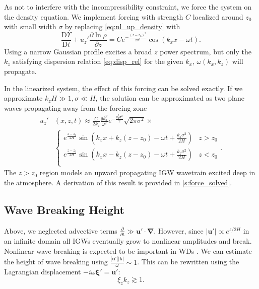\documentclass[
        fleqn,
        usenatbib,
    ]{mnras}
\newcommand*{\pd}[2]{\frac{\partial#1}{\partial#2}}
\newcommand*{\md}[2]{\frac{\mathrm{D}#1}{\mathrm{D}#2}}
\newcommand*{\abs}[1]{\left|#1\right|}
\newcommand*{\p}[1]{\left(#1\right)}
\newcommand*{\bm}[1]{\boldsymbol{\mathbf{#1}}}
\begin{document}
As not to interfere with the incompressibility constraint, we force the system
on the density equation. We implement forcing with strength $C$ localized around
$z_0$ with small width $\sigma$ by replacing \autoref{eq:nl_up_density} with
\begin{equation}
    \md{\Upsilon}{t} + u_{z}'\pd{\ln \overline{\rho}}{z}
        = Ce^{-\frac{(z - z_0)^2}{2\sigma^2}}
            \cos \p{k_{x}x - \omega t}.\label{eq:vol_drive}
\end{equation}
Using a narrow Gaussian profile excites a broad $z$ power spectrum, but only the
$k_{z}$ satisfying dispersion relation \autoref{eq:disp_rel} for the given
$k_{x}$, $\omega(k_{x}, k_{z})$ will propagate.

In the linearized system, the effect of this forcing can be solved exactly. If
we approximate $k_zH \gg 1, \sigma \ll H$, the solution can be approximated as
two plane waves propagating away from the forcing zone
\begin{align}
    u_{z}'&(x, z, t) \approx{} \frac{C}{2k_z}\frac{gk_x^2}{\omega^2}
        e^{-\frac{k_z^2\sigma^2}{2}}
        \sqrt{2\pi \sigma^2} \times\nonumber\\
        &{}\begin{cases}
        e^{\frac{z - z_0}{2H}}\sin\p{k_{x}x + k_{z}(z - z_0) - \omega t
            + \frac{k_z\sigma^2}{2H}}
            & z > z_0\\
        e^{\frac{z - z_0}{2H}}\sin\p{k_{x}x - k_{z}(z - z_0) - \omega t
            + \frac{k_z\sigma^2}{2H}}
            & z < z_0\\
    \end{cases}.\label{eq:uz_lin}
\end{align}
The $z > z_0$ region models an upward propagating IGW wavetrain excited deep
in the atmosphere. A derivation of this result is provided in
\autoref{s:force_solved}.

\subsection{Wave Breaking Height}\label{ss:wave_breaking}

Above, we neglected advective terms $\pd{}{t} \gg \bm{u}' \cdot \bm{\nabla}$.
However, since $\abs{\bm{u}'} \propto e^{z/2H}$ in an infinite domain all IGWs
eventually grow to nonlinear amplitudes and break. Nonlinear wave breaking is
expected to be important in WDs \citep{fullerI,fullerII}. We can
estimate the height of wave breaking using $\frac{\abs{\bm{u}'}
\abs{\bm{k}}}{\omega} \sim 1$. This can be rewritten using the Lagrangian
displacement $-i\omega \bm{\xi}' = \bm{u}'$:
\begin{equation}
    \xi_z k_z \gtrsim 1.\label{eq:nl}
\end{equation}
\end{document}
